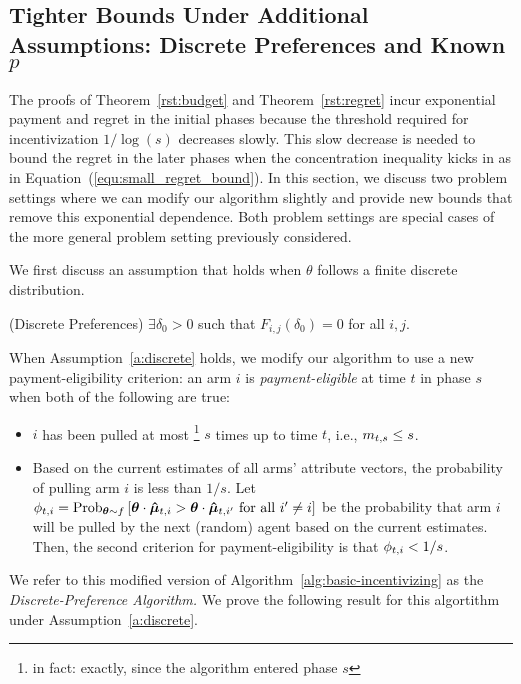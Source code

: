 \subsection{Tighter Bounds Under Additional Assumptions: Discrete Preferences and Known $p$}

The proofs of Theorem~\ref{rst:budget} and Theorem~\ref{rst:regret} incur exponential payment and regret in the initial phases because the threshold required for incentivization $1/\log(s)$ decreases slowly.  This slow decrease is needed to bound the regret in the later phases when the concentration inequality kicks in as in Equation~(\ref{equ:small_regret_bound}). In this section, we discuss two problem settings where we can modify our algorithm slightly and provide new bounds that remove this exponential dependence.  Both problem settings are special cases of the more general problem setting previously considered.

We first discuss an assumption that holds when $\theta$ follows a finite discrete distribution.
\begin{assumption}
\label{a:discrete}
(Discrete Preferences) 
$\exists \delta_0>0$ such that $F_{i,j}(\delta_0)=0$ for all $i,j$.
\end{assumption}

When Assumption~\ref{a:discrete} holds, we modify our algorithm to use a new payment-eligibility criterion: an arm $i$ is \emph{payment-eligible} at time $t$ in phase $s$ when both of the following are true:
\begin{itemize}
\item $i$ has been pulled at most%
\footnote{in fact: exactly, since the algorithm entered phase $s$}
$s$ times up to time $t$, i.e., $m_{t,s} \leq s$.
\item Based on the current estimates  of all arms'
attribute vectors, the probability of pulling arm $i$ is less than $1/s$. Let $\PullProb{t}{i} = \Prob[\AgV \sim \AgentDist]{\AgV \cdot \ArmEV{t}{i} > \AgV
  \cdot \ArmEV{t}{i'} \mbox{ for all } i' \neq i}$
be the probability that arm $i$ will be pulled
by the next (random) agent based on the current estimates. 
Then, the second criterion for payment-eligibility is that
$\phi_{t,i} < 1/s$.
\end{itemize}

We refer to this modified version of Algorithm~\ref{alg:basic-incentivizing} as the {\it Discrete-Preference Algorithm.} We prove the following result for this algortithm under Assumption~\ref{a:discrete}.

